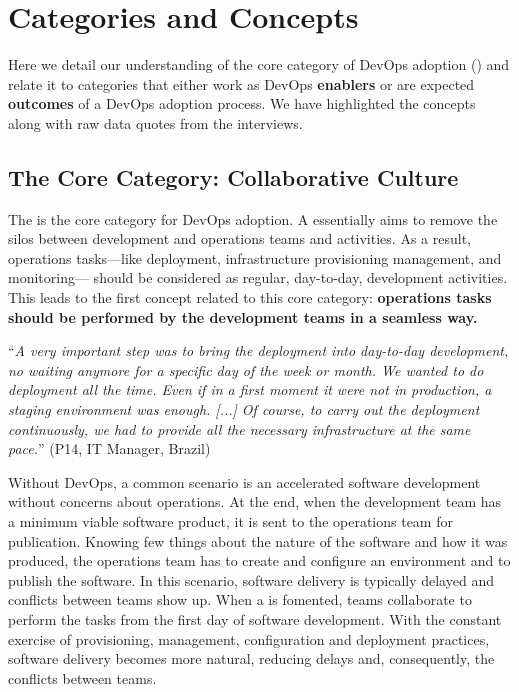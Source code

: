 \section{Categories and Concepts} \label{sec:categories_concepts}

Here we detail our
understanding of the core category
of DevOps adoption (\cc)
and relate it to categories that either work as DevOps {\bf enablers} or
are expected {\bf outcomes} of a DevOps adoption process.
We have highlighted the concepts along with raw data quotes from the interviews.

\subsection{The Core Category: Collaborative Culture}

The \cc is the core category
for DevOps adoption. A \cc essentially aims to remove
the silos between development and operations teams and activities.
As a result, operations tasks---like deployment, infrastructure provisioning
management, and monitoring--- should be considered as regular, day-to-day,
development activities. This leads to the first concept related to
this core category: {\bf operations tasks should be performed by
the development teams in a seamless way.}

\begin{mq}
``\emph{A very important step was to bring the deployment into day-to-day
development, no waiting anymore for a specific day of the week or month. We wanted
to do deployment all the time. Even if in a first moment it were not in
production, a staging environment was enough. [...] Of course, to carry out the deployment
continuously, we had to provide all the necessary infrastructure at the same
pace.}'' (P14, IT Manager, Brazil)
\end{mq}

Without DevOps, a common scenario is an accelerated software development
without concerns about operations. At the end, when the development team has a
minimum viable software product, it is sent to the operations team for
publication. Knowing few things about the nature of the software and how it
was produced, the operations team has to create and configure an environment
and to publish the software. In this scenario, software delivery is typically
delayed and conflicts between teams show up. When a \cc is fomented, teams collaborate to perform the tasks from the first day
of software development. With the constant exercise of provisioning, management,
configuration and deployment practices, software delivery becomes more natural,
reducing delays and, consequently, the conflicts between teams.


